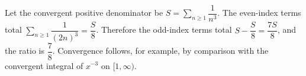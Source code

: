Let the convergent positive denominator be $ S=\sum_{n\ge1}\dfrac{1}{n^3}$. The even-index terms total $\sum_{n\ge1}\dfrac{1}{(2n)^3}=\dfrac{S}{8}$. Therefore the odd-index terms total $ S-\dfrac{S}{8}=\dfrac{7S}{8}$, and the ratio is $\boxed{\dfrac{7}{8}}$. Convergence follows, for example, by comparison with the convergent integral of $ x^{-3}$ on $[1,\infty)$.
